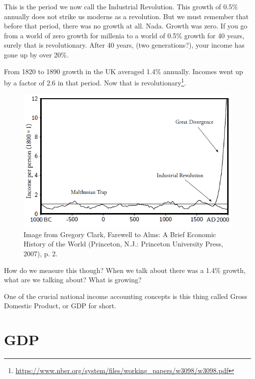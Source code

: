 \documentclass[
]{book}
\begin{document}
This is the period we now call the Industrial Revolution. This growth of 0.5\% annually does not strike us moderns as a revolution. But we must remember that before that period, there was no growth at all. Nada. Growth was zero. If you go from a world of zero growth for millenia to a world of 0.5\% growth for 40 years, surely that is revolutionary. After 40 years, (two generations?), your income has gone up by over 20\%.

From 1820 to 1890 growth in the UK averaged 1.4\% annually. Incomes went up by a factor of 2.6 in that period. Now that is revolutionary\footnote{\url{https://www.nber.org/system/files/working_papers/w3098/w3098.pdf}}.

\begin{figure}

{\centering \includegraphics[width=1\linewidth]{img/growth/fig2} 

}

\caption{Image from Gregory Clark, Farewell to Alms: A Brief Economic History of the World (Princeton, N.J.: Princeton University Press, 2007), p. 2.}\label{fig:growth02}
\end{figure}

How do we measure this though? When we talk about there was a 1.4\% growth, what are we talking about? What is growing?

One of the crucial national income accounting concepts is this thing called Gross Domestic Product, or GDP for short.

\hypertarget{gdp}{%
\section{GDP}\label{gdp}}
\end{document}
